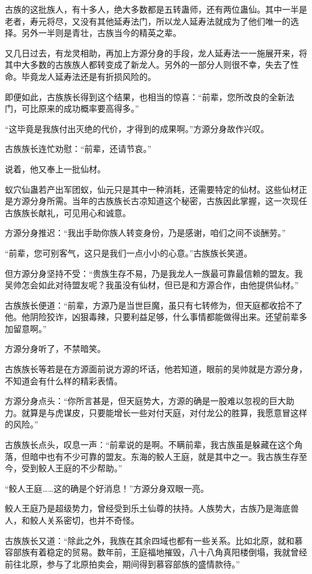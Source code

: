 \begin{this_body}
古族的这批族人，有十多人，绝大多数都是五转蛊师，还有两位蛊仙。其中一半是老者，寿元将尽，又没有其他延寿法门，所以龙人延寿法就成为了他们唯一的选择。另外一半则是青壮，古族当今的精英之辈。

又几日过去，有龙灵相助，再加上方源分身的手段，龙人延寿法一一施展开来，将其中大多数的古族族人都转变成了新龙人。另外的一部分人则很不幸，失去了性命。毕竟龙人延寿法还是有折损风险的。

即便如此，古族族长得到这个结果，也相当的惊喜：“前辈，您所改良的全新法门，可比原来的成功概率要高得多。”

“这毕竟是我族付出灭绝的代价，才得到的成果啊。”方源分身故作兴叹。

古族族长连忙劝慰：“前辈，还请节哀。”

说着，他又奉上一批仙材。

蚁穴仙蛊若产出军团蚁，仙元只是其中一种消耗，还需要特定的仙材。这些仙材正是方源分身所需。当年的古族族长古凉知道这个秘密，古族因此掌握，这一次现任古族族长献礼，可见用心和诚意。

方源分身推迟：“我出手助你族人转变身份，乃是感谢，咱们之间不谈酬劳。”

“前辈，您可别客气，这只是我们一点小小的心意。”古族族长笑道。

但方源分身坚持不受：“贵族生存不易，乃是我龙人一族最可靠最信赖的盟友。我吴帅怎会如此对待盟友呢？我虽没有仙材，但已是和方源合作，由他提供仙材。”

古族族长便道：“前辈，方源乃是当世巨魔，虽只有七转修为，但天庭都收拾不了他。他阴险狡诈，凶狠毒辣，只要利益足够，什么事情都能做得出来。还望前辈多加留意啊。”

方源分身听了，不禁暗笑。

古族族长等若是在方源面前说方源的坏话，他若知道，眼前的吴帅就是方源分身，不知道会有什么样的精彩表情。

方源分身点头：“你所言甚是，但天庭势大，方源的确是一股难以忽视的巨大助力。就算是与虎谋皮，只要能增长一些对付天庭，对付龙公的胜算，我愿意冒这样的风险。”

古族族长点头，叹息一声：“前辈说的是啊。不瞒前辈，我古族虽是躲藏在这个角落，但暗中也有不少可靠的盟友。东海的鲛人王庭，就是其中之一。我古族生存至今，受到鲛人王庭的不少帮助。”

“鲛人王庭……这的确是个好消息！”方源分身双眼一亮。

鲛人王庭乃是超级势力，曾经受到乐土仙尊的扶持。人族势大，古族乃是海底兽人，和鲛人关系密切，也并不奇怪。

古族族长又道：“除此之外，我族在其余四域也都有一些关系。比如北原，就和慕容部族有着稳定的贸易。数年前，王庭福地摧毁，八十八角真阳楼倒塌，我就曾经前往北原，参与了北原拍卖会，期间得到慕容部族的盛情款待。”


\end{this_body}
